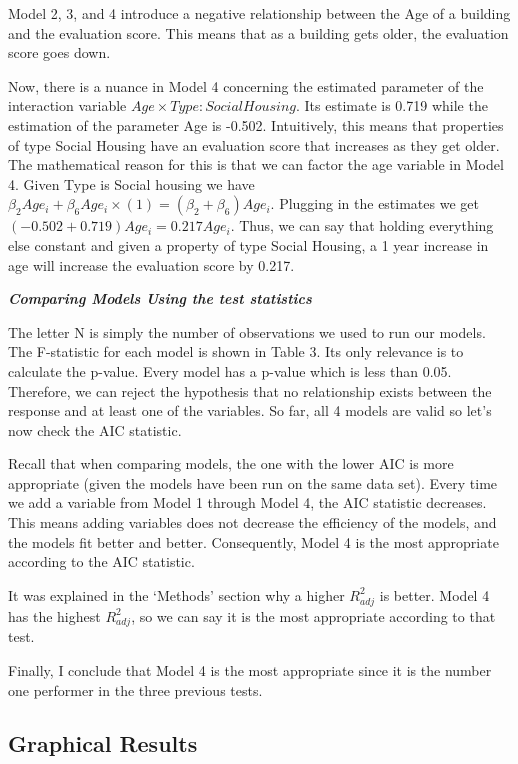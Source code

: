 \documentclass[
]{article}
\begin{document}
Model 2, 3, and 4 introduce a negative relationship between the Age of a
building and the evaluation score. This means that as a building gets
older, the evaluation score goes down.

Now, there is a nuance in Model 4 concerning the estimated parameter of
the interaction variable \(Age \times Type: Social Housing\). Its
estimate is 0.719 while the estimation of the parameter Age is -0.502.
Intuitively, this means that properties of type Social Housing have an
evaluation score that increases as they get older. The mathematical
reason for this is that we can factor the age variable in Model 4. Given
Type is Social housing we have
\(\beta_2Age_i + \beta_6Age_i \times(1) = (\beta_2 + \beta_6) Age_i\).
Plugging in the estimates we get \((-0.502 + 0.719)Age_i = 0.217Age_i\).
Thus, we can say that holding everything else constant and given a
property of type Social Housing, a 1 year increase in age will increase
the evaluation score by 0.217.

\textbf{\emph{Comparing Models Using the test statistics}}

The letter N is simply the number of observations we used to run our
models. The F-statistic for each model is shown in Table 3. Its only
relevance is to calculate the p-value. Every model has a p-value which
is less than 0.05. Therefore, we can reject the hypothesis that no
relationship exists between the response and at least one of the
variables. So far, all 4 models are valid so let's now check the AIC
statistic.

Recall that when comparing models, the one with the lower AIC is more
appropriate (given the models have been run on the same data set). Every
time we add a variable from Model 1 through Model 4, the AIC statistic
decreases. This means adding variables does not decrease the efficiency
of the models, and the models fit better and better. Consequently, Model
4 is the most appropriate according to the AIC statistic.

It was explained in the `Methods' section why a higher \(R_{adj}^2\) is
better. Model 4 has the highest \(R_{adj}^2\), so we can say it is the
most appropriate according to that test.

Finally, I conclude that Model 4 is the most appropriate since it is the
number one performer in the three previous tests.

\hypertarget{graphical-results}{%
\subsection{Graphical Results}\label{graphical-results}}
\end{document}
